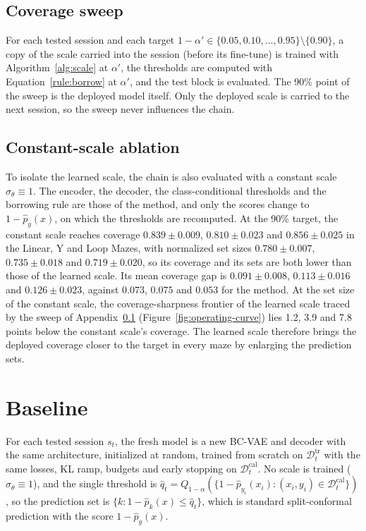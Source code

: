 \documentclass{article}
\begin{document}
\FloatBarrier
\subsection{Coverage sweep}
\label{app:sweep}
For each tested session and each target $1-\alpha'\in\{0.05,0.10,\ldots,0.95\}\setminus\{0.90\}$, a copy of the scale carried into the session (before its fine-tune) is trained with Algorithm~\ref{alg:scale} at $\alpha'$, the thresholds are computed with Equation~\eqref{rule:borrow} at $\alpha'$, and the test block is evaluated. The 90\% point of the sweep is the deployed model itself. Only the deployed scale is carried to the next session, so the sweep never influences the chain.

\subsection{Constant-scale ablation}
\label{app:ablation}
To isolate the learned scale, the chain is also evaluated with a constant scale $\sigma_\theta\equiv1$. The encoder, the decoder, the class-conditional thresholds and the borrowing rule are those of the method, and only the scores change to $1-\hat p_{y}(x)$, on which the thresholds are recomputed. At the 90\% target, the constant scale reaches coverage $0.839\pm0.009$, $0.810\pm0.023$ and $0.856\pm0.025$ in the Linear, Y and Loop Mazes, with normalized set sizes $0.780\pm0.007$, $0.735\pm0.018$ and $0.719\pm0.020$, so its coverage and its sets are both lower than those of the learned scale. Its mean coverage gap is $0.091\pm0.008$, $0.113\pm0.016$ and $0.126\pm0.023$, against $0.073$, $0.075$ and $0.053$ for the method. At the set size of the constant scale, the coverage-sharpness frontier of the learned scale traced by the sweep of Appendix~\ref{app:sweep} (Figure~\ref{fig:operating-curve}) lies 1.2, 3.9 and 7.8 points below the constant scale's coverage. The learned scale therefore brings the deployed coverage closer to the target in every maze by enlarging the prediction sets.

\section{Baseline}
\label{app:baseline}
For each tested session $s_t$, the fresh model is a new BC-VAE and decoder with the same architecture, initialized at random, trained from scratch on $\mathcal{D}^{\mathrm{tr}}_t$ with the same losses, KL ramp, budgets and early stopping on $\mathcal{D}^{\mathrm{cal}}_t$. No scale is trained ($\sigma_\theta\equiv1$), and the single threshold is $\hat q_t=Q_{1-\alpha}(\{1-\hat p_{y_i}(x_i):(x_i,y_i)\in\mathcal{D}^{\mathrm{cal}}_t\})$, so the prediction set is $\{k:1-\hat p_k(x)\le\hat q_t\}$, which is standard split-conformal prediction with the score $1-\hat p_y(x)$.
\end{document}
